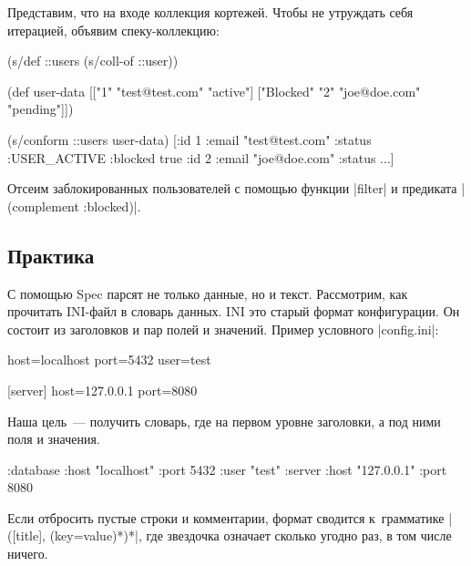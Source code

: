 Представим, что на входе коллекция кортежей. Чтобы не утруждать себя итерацией,
объявим спеку-коллекцию:

\begin{english}
  \begin{clojure}
(s/def ::users (s/coll-of ::user))

(def user-data
  [["1" "test@test.com" "active"]
   ["Blocked" "2" "joe@doe.com" "pending"]])

(s/conform ::users user-data)
[{:id 1 :email "test@test.com" :status :USER_ACTIVE}
 {:blocked true :id 2 :email "joe@doe.com" :status ...}]
  \end{clojure}
\end{english}


Отсеим заблокированных пользователей с помощью функции \spverb|filter| и
предиката \spverb|(complement :blocked)|.

\subsection{Практика}


С помощью Spec парсят не только данные, но и текст. Рассмотрим, как прочитать
INI-файл в словарь данных. INI
это старый формат конфигурации. Он состоит из заголовков и пар полей и
значений. Пример условного \spverb|config.ini|:

\begin{english}
  \begin{ini}
[database]
host=localhost
port=5432
user=test

[server]
host=127.0.0.1
port=8080
  \end{ini}
\end{english}

Наша цель~--- получить словарь, где на первом уровне заголовки, а под ними поля
и значения.

\begin{english}
  \begin{clojure}
{:database {:host "localhost"
            :port 5432
            :user "test"}
 :server {:host "127.0.0.1"
          :port 8080}}
  \end{clojure}
\end{english}

Если отбросить пустые строки и комментарии, формат сводится к~грамматике
\spverb|([title], (key=value)*)*|, где звездочка означает сколько угодно раз, в
том числе ничего.

